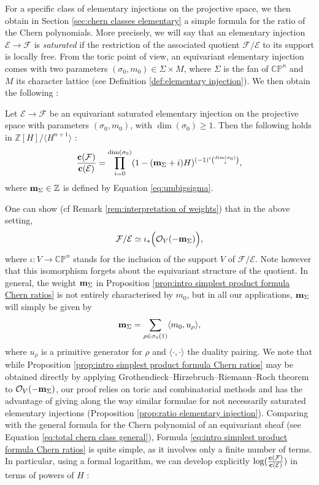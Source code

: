 \documentclass[a4paper,10pt]{amsart}
\theoremstyle{plain}{
    \newtheorem{theorem}{Theorem}[section]
    \newtheorem{lemma}[theorem]{Lemma}
    \newtheorem{corollary}[theorem]{Corollary}
    \newtheorem{proposition}[theorem]{Proposition}
    \newtheorem{conjecture}[theorem]{Conjecture}
}
\theoremstyle{definition}{
    \newtheorem{definition}[theorem]{Definition}
    \newtheorem{defn-thm}[theorem]{Definition-Theorem}
    \newtheorem{example}[theorem]{Example}
    \newtheorem{notation}[theorem]{Notation}
}
\theoremstyle{remark}{
    \newtheorem{remark}[theorem]{Remark}
    \newtheorem{problem}[theorem]{Problem}
    \newtheorem{question}[theorem]{Question}
}
\def\um{{\bf m}}
\def\uc{{\bf c}}
\def\cF{\mathcal{F}}
\def\cE{\mathcal{E}}
\def\cO{\mathcal{O}}
\def\Z{\mathbb{Z}}
\def\P{\mathbb{P}}
\def\C{\mathbb{C}}
\begin{document}
 
For a specific class of elementary injections on the projective space, we then obtain  in Section \ref{sec:chern classes elementary} a simple formula for the ratio of the Chern polynomials. More precisely, we will say that an elementary injection $\cE\to\cF$ is {\it saturated} if the restriction of the associated quotient $\cF/\cE$ to its support is locally free. From the toric point of view, an equivariant elementary injection comes with two parameters $(\sigma_0,m_0)\in\Sigma\times M$, where $\Sigma$ is the fan of $\C\P^n$ and $M$ its character lattice (see Definition \ref{def:elementary injection}). We then obtain the following  :
\begin{proposition}
 \label{prop:intro simplest product formula Chern ratios}
 Let  $\cE\to \cF$ be an equivariant saturated elementary  injection on the projective space with parameters $(\sigma_0,m_0)$, with $\dim(\sigma_0)\geq 1$. Then the following holds in $\Z[H]/\langle H^{n+1} \rangle$ :
  \begin{equation}
   \label{eq:intro simplest product formula Chern ratios}
  \frac{\uc(\cF)}{\uc(\cE)}=\prod_{i=0}^{\dim(\sigma_0)}(1-(\um_\Sigma+i)H)^{(-1)^i\binom{\dim(\sigma_0)}{i}},
  \end{equation}
  where $\um_\Sigma\in\Z$ is defined by Equation \eqref{eq:umbigsigma}. 
\end{proposition}
 One can show (cf Remark \ref{rem:interpretation of weights}) that in the above setting,
 $$
 \cF/\cE\simeq \iota_*\Big(\cO_{V}(-\um_\Sigma)\Big),
 $$
 where $\iota:V\to\C\P^n$ stands for the inclusion of the support $V$ of $\cF/\cE$. Note however that this isomorphism forgets about the equivariant structure of the quotient. In general, the weight $\um_\Sigma$ in Proposition \ref{prop:intro simplest product formula Chern ratios} is not entirely characterised by $m_0$, but in all our applications, $\um_\Sigma$ will simply be given by
$$
\um_\Sigma=\sum_{\rho\in\sigma_0(1)}\langle m_0, u_\rho \rangle,
$$
where $u_\rho$ is a primitive generator for $\rho$ and $\langle\cdot,\cdot\rangle$ the duality pairing. We note that while Proposition \ref{prop:intro simplest product formula Chern ratios} may be obtained directly by applying Grothendieck--Hirzebruch--Riemann--Roch theorem to $\cO_{V}(-\um_\Sigma)$, our proof relies on toric and combinatorial methods and has the advantage of giving along the way similar formulae for not necessarily saturated elementary injections (Proposition \ref{prop:ratio elementary injection}). Comparing with the general formula for the Chern polynomial of an equivariant sheaf (see Equation \eqref{eq:total chern class general}),  Formula \eqref{eq:intro simplest product formula Chern ratios} is quite simple, as it involves only a finite number of terms. In particular, using a formal logarithm, we can develop explicitly $\log(\frac{\uc(\cF)}{\uc(\cE)})$ in terms of powers of $H$ :
\end{document}
